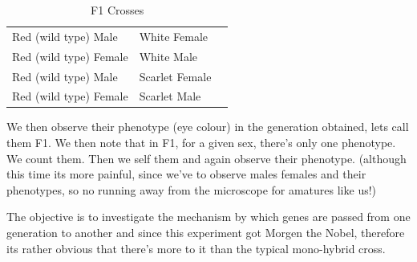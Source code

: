 	\begin{table}
		\myfloatalign
		\begin{tabularx}{\textwidth}{Xll}
			\hline%
			Red (wild type) Male & White Female\\
			Red (wild type) Female & White Male\\
			Red (wild type) Male & Scarlet Female\\
			Red (wild type) Female & Scarlet Male\\
			\hline%
		\end{tabularx}
		\caption{F1 Crosses}
		\label{2_f1_crosses}
	\end{table}

	We then observe their phenotype (eye colour) in the generation obtained, lets call them F1. We then note that in F1, for a given sex, there's only one phenotype. We count them. Then we self them and again observe their phenotype. (although this time its more painful, since we've to observe males females and their phenotypes, so no running away from the microscope for amatures like us!) 
	\par 
	The objective is to investigate the mechanism by which genes are passed from one generation to another and since this experiment got Morgen the Nobel, therefore its rather obvious that there's more to it than the typical mono-hybrid cross.

